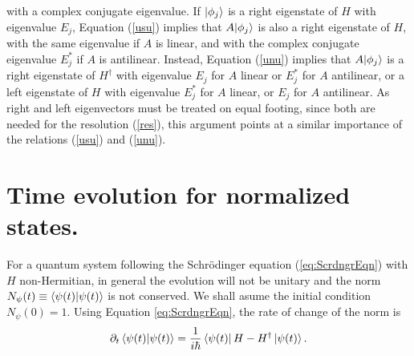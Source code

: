 with a complex conjugate eigenvalue. If $|\phi_j\rangle$ is  a right eigenstate of $H$
with eigenvalue $E_j$, Equation (\ref{usu}) implies that
$A|\phi_j\rangle$ is also a right  eigenstate of $H$, with the
same eigenvalue if $A$ is linear, and with the complex conjugate eigenvalue $E_j^*$ if $A$ is antilinear.
Instead, Equation (\ref{unu}) implies that $A|\phi_j\rangle$ is a right eigenstate of $H^\dagger$
with eigenvalue $E_j$ for $A$ linear or $E_j^*$ for $A$ antilinear, or a left eigenstate of $H$ with eigenvalue
$E_j^*$ for $A$ linear, or $E_j$ for $A$ antilinear.
As right and left eigenvectors must be treated on equal footing, since both are needed for the
resolution (\ref{res}), this argument points at a similar importance of the relations (\ref{usu}) and (\ref{unu}).
%
%
%
%
\section{Time evolution for normalized states.}
%
%
For a quantum system following the  Schr\"odinger equation (\ref{eq:ScrdngrEqn})
%
%
with $H$ non-Hermitian, in general the evolution will not  be unitary and
the norm $N_{\psi}(t) \equiv \braket{\psi(t)}{\psi(t)}$ is not conserved.
%
%
We shall asume the initial condition $N_{\psi}(0)=1$. Using Equation \eqref{eq:ScrdngrEqn},
the rate of change of the norm is
%
\begin{equation}
    \partial_t \braket{\psi(t)}{\psi(t)} = \frac{1}{i\hbar}\bra{\psi(t)}H-H^\dagger\ket{\psi(t)}.
    \label{eq:NormChange}
\end{equation}
%
%
%
